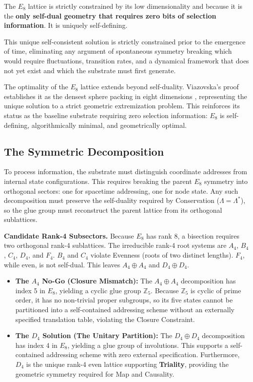 The $E_8$ lattice is strictly constrained by its low dimensionality and because it is the \textbf{only self-dual geometry that requires zero bits of selection information}. It is uniquely self-defining.

This unique self-consistent solution is strictly constrained prior to the emergence of time, eliminating any argument of spontaneous symmetry breaking which would require fluctuations, transition rates, and a dynamical framework that does not yet exist and which the substrate must first generate.

The optimality of the $E_8$ lattice extends beyond self-duality. Viazovska's proof establishes it as the densest sphere packing in eight dimensions \cite{viazovska_sphere_2017}, representing the unique solution to a strict geometric extremization problem. This reinforces its status as the baseline substrate requiring zero selection information: $E_8$ is self-defining, algorithmically minimal, and geometrically optimal.

\subsection{The Symmetric Decomposition}
\label{sec:symmetric_decomposition}

To process information, the substrate must distinguish coordinate addresses from internal state configurations. This requires breaking the parent $E_8$ symmetry into orthogonal sectors: one for spacetime addressing, one for node state. Any such decomposition must preserve the self-duality required by Conservation ($\Lambda = \Lambda^*$), so the glue group must reconstruct the parent lattice from its orthogonal sublattices.

\textbf{Candidate Rank-4 Subsectors.} 
Because $E_8$ has rank 8, a bisection requires two orthogonal rank-4 sublattices. The irreducible rank-4 root systems are $A_4$, $B_4$, $C_4$, $D_4$, and $F_4$. $B_4$ and $C_4$ violate Evenness (roots of two distinct lengths). $F_4$, while even, is not self-dual. This leaves $A_4 \oplus A_4$ and $D_4 \oplus D_4$.

\begin{itemize}
    \item \textbf{The \texorpdfstring{$A_4$}{A4} No-Go (Closure Mismatch):} The $A_4 \oplus A_4$ decomposition has index 5 in $E_8$, yielding a cyclic glue group $\mathbb{Z}_5$. Because $\mathbb{Z}_5$ is cyclic of prime order, it has no non-trivial proper subgroups, so its five states cannot be partitioned into a self-contained addressing scheme without an externally specified translation table, violating the Closure Constraint.
    
    \item \textbf{The \texorpdfstring{$D_4$}{D4} Solution (The Unitary Partition):} The $D_4 \oplus D_4$ decomposition has index 4 in $E_8$, yielding a glue group of involutions. This supports a self-contained addressing scheme with zero external specification. Furthermore, $D_4$ is the unique rank-4 even lattice supporting \textbf{Triality}, providing the geometric symmetry required for Map and Causality.
\end{itemize}

